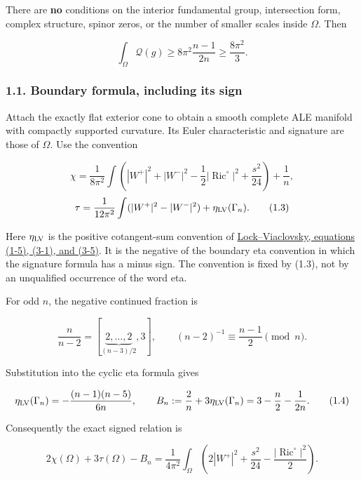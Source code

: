 \documentclass[
  10pt,
]{article}
\begin{document}
There are \textbf{no} conditions on the interior fundamental group,
intersection form, complex structure, spinor zeros, or the number of
smaller scales inside \(\Omega\). Then

\[
 \boxed{\int_\Omega\mathscr Q(g)\ge
              8\pi^2\frac{n-1}{2n}\ge\frac{8\pi^2}{3}.}
                                                        \tag{1.2}
\]

\hypertarget{boundary-formula-including-its-sign}{%
\subsubsection{1.1. Boundary formula, including its
sign}\label{boundary-formula-including-its-sign}}

Attach the exactly flat exterior cone to obtain a smooth complete ALE
manifold with compactly supported curvature. Its Euler characteristic
and signature are those of \(\Omega\). Use the convention

\[
 \chi=\frac1{8\pi^2}\int
       \left(|W^+|^2+|W^-|^2-\frac12|\operatorname{Ric}^{\circ}|^2
                                      +\frac{s^2}{24}\right)+\frac1n,
\] \[
 \tau=\frac1{12\pi^2}\int(|W^+|^2-|W^-|^2)
                                      +\eta_{\rm LV}(\Gamma_n).
                                                        \tag{1.3}
\]

Here \(\eta_{\rm LV}\) is the positive cotangent-sum convention of
\href{https://msp.org/gt/2016/20-3/gt-v20-n3-p13-s.pdf}{Lock--Viaclovsky,
equations (1-5), (3-1), and (3-5)}. It is the negative of the boundary
eta convention in which the signature formula has a minus sign. The
convention is fixed by (1.3), not by an unqualified occurrence of the
word eta.

For odd \(n\), the negative continued fraction is

\[
 \frac{n}{n-2}=[\underbrace{2,\ldots,2}_{(n-3)/2},3],
 \qquad (n-2)^{-1}\equiv\frac{n-1}{2}\pmod n.
\]

Substitution into the cyclic eta formula gives

\[
 \eta_{\rm LV}(\Gamma_n)
       =-\frac{(n-1)(n-5)}{6n},\qquad
 B_n:=\frac2n+3\eta_{\rm LV}(\Gamma_n)
       =3-\frac n2-\frac1{2n}.
                                                        \tag{1.4}
\]

Consequently the exact signed relation is

\[
 2\chi(\Omega)+3\tau(\Omega)-B_n
 =\frac1{4\pi^2}\int_\Omega
       \left(2|W^+|^2+\frac{s^2}{24}
                                  -\frac{|\operatorname{Ric}^{\circ}|^2}{2}\right).
                                                        \tag{1.5}
\]
\end{document}

